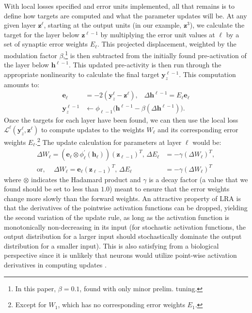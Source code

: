 \documentclass[letterpaper]{article} %
\begin{document}
With local losses specified and error units implemented, all that remains is to define how targets are computed and what the parameter updates will be. At any given layer $\mathbf{z}^\ell$, starting at the output units (in our example, $\mathbf{z}^3$), we calculate the target for the layer below $\mathbf{z}^{\ell-1}$ by multiplying the error unit values at $\ell$ by a set of synaptic error weights $E_\ell$. This projected displacement, weighted by the modulation factor $\beta$,\footnote{In this paper, $\beta = 0.1$, found with only minor prelim. tuning.} is then subtracted from the initially found pre-activation of the layer below $\mathbf{h}^{\ell-1}$. This updated pre-activity is then run through the appropriate nonlinearity to calculate the final target $\mathbf{y}^{\ell-1}_z$. This computation amounts to:
\begin{align}
\mathbf{e}_\ell &= -2 ( \mathbf{y}^\ell_z - \mathbf{z}^\ell ) \mbox{,} \quad \Delta \mathbf{h}^{\ell-1} = E_\ell \mathbf{e}_\ell \\
\mathbf{y}^{\ell-1}_z &\leftarrow \phi_{\ell-1} \Big( \mathbf{h}^{\ell-1} - \beta ( \Delta \mathbf{h}^{\ell-1} ) \Big) \mbox{.} \label{eqn:displace}
\end{align}
Once the targets for each layer have been found, we can then use the local loss $\mathcal{L}^{\ell}(\mathbf{y}^{\ell}_z,\mathbf{z}^{\ell})$ to compute updates to the weights $W_{\ell}$ and its corresponding error weights $E_{\ell}.$\footnote{Except for $W_1$, which has no corresponding error weights $E_1$.} The update calculation for parameters at layer $\ell$ would be:
\begin{align}
  \Delta W_{\ell} = (\mathbf{e}_{\ell} \otimes  \phi^\prime_\ell(\mathbf{h}_\ell) )(\mathbf{z}_{\ell-1})^T \mbox{, } \Delta E_{\ell} &= -\gamma (\Delta W_\ell)^T, \\
  \mbox{or, } \quad  \Delta W_{\ell} = \mathbf{e}_{\ell} (\mathbf{z}_{\ell-1})^T \mbox{, } \Delta E_{\ell} &= -\gamma (\Delta W_\ell)^T
\end{align}
where $\otimes$ indicates the Hadamard product and $\gamma$ is a decay factor (a value that we found should be set to less than $1.0$) meant to ensure that the error weights change more slowly than the forward weights. An attractive property of LRA is that the derivatives of the pointwise activation functions can be dropped, yielding the second variation of the update rule, as long as the activation function is monotonically non-decreasing in its input (for stochastic activation functions, the output distribution for a larger input should stochastically dominate the output distribution for a smaller input). This is also satisfying from a biological perspective since it is unlikely that neurons would utilize point-wise activation derivatives in computing updates \cite{hinton1988learning}.
\end{document}
